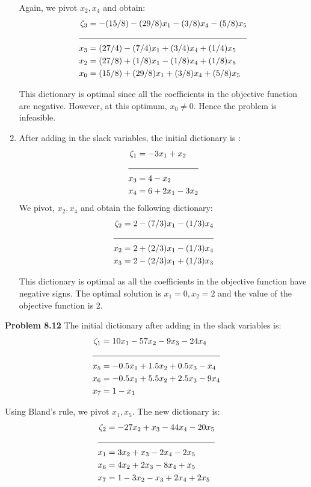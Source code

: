 \documentclass[letterpaper,12pt]{article}
\theoremstyle{definition}
\begin{document}
\begin{enumerate}
Again, we pivot $x_2, x_4$ and obtain:
\begin{align*}
  \zeta_3 &= -(15/8)- (29/8)x_1-(3/8)x_4- (5/8)x_5\\
  \cline{1-2}
  x_3 &= (27/4) - (7/4)x_1+(3/4)x_4+(1/4)x_5\\
  x_2 &= (27/8) + (1/8)x_1 -(1/8)x_4+(1/8)x_5\\
  x_0 &= (15/8) + (29/8)x_1 + (3/8)x_4 + (5/8)x_5\\
\end{align*}

This dictionary is optimal since all the coefficients in the objective function are negative. However,
at this optimum, $x_0 \ne 0$. Hence the problem is infeasible.

\item After adding in the slack variables, the initial dictionary is :
\begin{align*}
  \zeta_1 &= -3x_1+x_2\\
  \cline{1-2}
  x_3 &= 4-x_2\\
  x_4 &= 6+2x_1-3x_2\\
\end{align*}
We pivot, $x_2, x_4$ and obtain the following dictionary:
\begin{align*}
  \zeta_2 &= 2-(7/3)x_1-(1/3)x_4\\
  \cline{1-2}
  x_2 &= 2+(2/3)x_1 - (1/3)x_4\\
  x_3 &= 2-(2/3)x_1+(1/3)x_3\\
\end{align*}

This dictionary is optimal as all the coefficients in the objective function have negative signs.
The optimal solution is $x_1= 0, x_2 = 2$ and the value of the objective function is 2.
\end{enumerate}

\vspace{3mm}
\noindent\textbf{Problem 8.12}
The initial dictionary after adding in the slack variables is:
\begin{align*}
  \zeta_1 &= 10x_1-57x_2-9x_3-24x_4\\
  \cline{1-2}
  x_5 &= -0.5x_1 + 1.5x_2+0.5x_3-x_4\\
  x_6 &= -0.5x_1+5.5x_2 + 2.5x_3 -9x_4\\
  x_7 &= 1-x_1\\
\end{align*}

Using Bland's rule, we pivot $x_1, x_5$. The new dictionary is:
\begin{align*}
  \zeta_2 &= -27x_2+x_3-44x_4 - 20x_5\\
  \cline{1-2}
  x_1 &= 3x_2 + x_3 -2x_4-2x_5\\
  x_6 &= 4x_2+2x_3-8x_4+x_5\\
  x_7 &= 1-3x_2-x_3+2x_4+2x_5\\
\end{align*}
\end{document}
